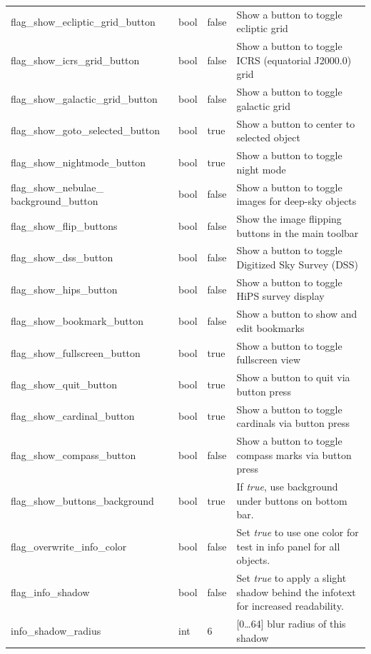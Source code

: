 \begin{longtable}{p{50mm}|l|l|p{55mm}}
flag\_show\_ecliptic\_grid\_button     & bool  & false & Show a button to toggle ecliptic grid\\
flag\_show\_icrs\_grid\_button         & bool  & false & Show a button to toggle ICRS (equatorial J2000.0) grid\\
flag\_show\_galactic\_grid\_button     & bool  & false & Show a button to toggle galactic grid\\
flag\_show\_goto\_selected\_button     & bool  & true  & Show a button to center to selected object\\
flag\_show\_nightmode\_button          & bool  & true  & Show a button to toggle night mode\\
flag\_show\_nebulae\_ \mbox{background\_button} & bool & false & Show a button to toggle images for deep-sky objects\\%
flag\_show\_flip\_buttons              & bool  & false & Show the image flipping buttons in the main toolbar \\%
flag\_show\_dss\_button                & bool  & false & Show a button to toggle Digitized Sky Survey (DSS)\\%
flag\_show\_hips\_button               & bool  & false & Show a button to toggle HiPS survey display\\%
flag\_show\_bookmark\_button           & bool  & false & Show a button to show and edit bookmarks\\
flag\_show\_fullscreen\_button         & bool  & true  & Show a button to toggle fullscreen view\\
flag\_show\_quit\_button               & bool  & true  & Show a button to quit via button press\\
flag\_show\_cardinal\_button           & bool  & true  & Show a button to toggle cardinals via button press\\
flag\_show\_compass\_button            & bool  & false & Show a button to toggle compass marks via button press\\
flag\_show\_buttons\_background        & bool  & true  & If \emph{true}, use background under buttons on bottom bar.\\\midrule
flag\_overwrite\_info\_color           & bool  & false & Set \emph{true} to use one color for test in info panel for all objects.\\
flag\_info\_shadow                     & bool  & false & Set \emph{true} to apply a slight shadow behind the infotext for increased readability.\\
info\_shadow\_radius                   & int   & 6     & [0\ldots64] blur radius of this shadow\\

\end{longtable}
